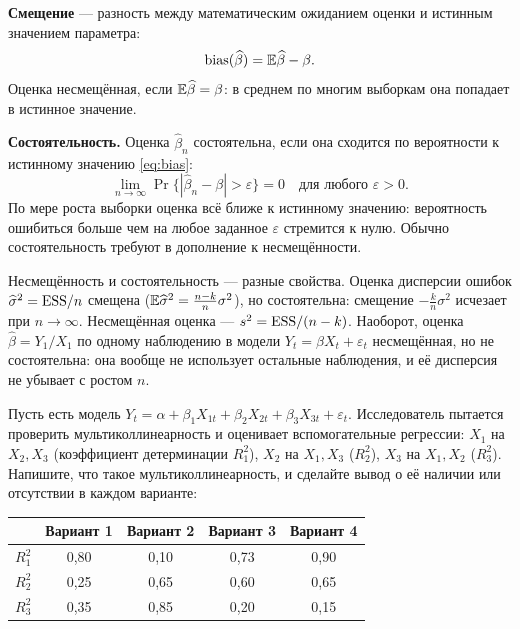 \begin{solution}
\textbf{Смещение} — разность между математическим ожиданием оценки и истинным
значением параметра:
\[
  \operatorname{bias}(\widehat{\beta}) = \mathbb{E}\widehat{\beta} - \beta .
\]
Оценка несмещённая, если $\mathbb{E}\widehat{\beta} = \beta$: в среднем по многим
выборкам она попадает в истинное значение.

\textbf{Состоятельность.} Оценка $\widehat{\beta}_n$ состоятельна, если она
сходится по вероятности к истинному значению \eqref{eq:bias}:
\[
  \lim_{n\to\infty}\Pr\bigl\{|\widehat{\beta}_n - \beta| > \varepsilon\bigr\} = 0
  \quad\text{для любого } \varepsilon > 0 .
\]
По мере роста выборки оценка всё ближе к истинному значению: вероятность
ошибиться больше чем на любое заданное $\varepsilon$ стремится к нулю. Обычно
состоятельность требуют в дополнение к несмещённости.

\begin{remark}
Несмещённость и состоятельность — разные свойства. Оценка дисперсии ошибок
$\widehat{\sigma}^2 = \mathrm{ESS}/n$ смещена ($\mathbb{E}\widehat{\sigma}^2 =
\frac{n-k}{n}\sigma^2$), но состоятельна: смещение $-\frac{k}{n}\sigma^2$
исчезает при $n \to \infty$. Несмещённая оценка — $s^2 = \mathrm{ESS}/(n-k)$.
Наоборот, оценка $\widehat{\beta} = Y_1/X_1$ по одному наблюдению в модели
$Y_t = \beta X_t + \varepsilon_t$ несмещённая, но не состоятельна: она вообще
не использует остальные наблюдения, и её дисперсия не убывает с ростом $n$.
\end{remark}
\end{solution}


Пусть есть модель $Y_t = \alpha + \beta_1X_{1t} + \beta_2X_{2t} +
\beta_3X_{3t} + \varepsilon_t$. Исследователь пытается проверить
мультиколлинеарность и оценивает вспомогательные регрессии: $X_1$ на $X_2,
X_3$ (коэффициент детерминации $R_1^2$), $X_2$ на $X_1, X_3$ ($R_2^2$), $X_3$ на
$X_1, X_2$ ($R_3^2$). Напишите, что такое мультиколлинеарность, и сделайте
вывод о её наличии или отсутствии в каждом варианте:
\begin{center}
\begin{tabular}{ccccc}
\toprule
 & Вариант 1 & Вариант 2 & Вариант 3 & Вариант 4 \\
\midrule
$R_1^2$ & 0,80 & 0,10 & 0,73 & 0,90 \\
$R_2^2$ & 0,25 & 0,65 & 0,60 & 0,65 \\
$R_3^2$ & 0,35 & 0,85 & 0,20 & 0,15 \\
\bottomrule
\end{tabular}
\end{center}

